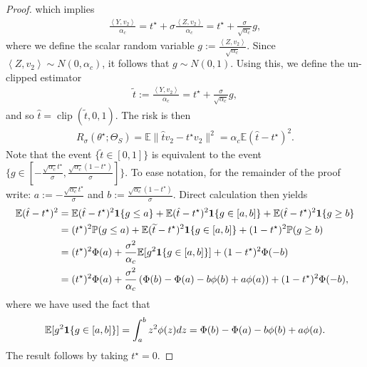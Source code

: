 \documentclass[11pt]{article}
\theoremstyle{plain}
\theoremstyle{definition}
\newcommand{\indicator}{{\bf{1}}}
\newcommand{\E}{\mathbb{E}}
\renewcommand{\P}{\mathbb{P}}
\newcommand{\tildet}{\widetilde{t}}
\newcommand{\hatt}{\hat{t}}
\newcommand{\inparen}[1]{\left(#1\right)}             %
\newcommand{\inp}[1]{\ensuremath{\left\langle #1 \right\rangle}}
\begin{document}
\begin{proof}
which implies 
\begin{align*}
    \frac{\inp{Y,v_2}}{\alpha_c} 
    = t^\star + \sigma \frac{\inp{Z, v_2}}{\alpha_c}
    = t^\star + \frac{\sigma}{\sqrt{\alpha_c}}g,
\end{align*}
where we define the scalar random variable $g:= \frac{\inp{Z, v_2}}{ \sqrt{\alpha_c}}$. Since $\inp{Z, v_2} \sim N(0, \alpha_c)$, it follows that $g \sim N(0,1)$.
Using this, we define the un-clipped estimator
\begin{align*}
    \tildet := \frac{\inp{Y,v_2}}{\alpha_c} = t^\star + \frac{\sigma}{\sqrt{\alpha_c}} g,
\end{align*}
and so $\hatt = \operatorname{clip}(\tildet,0,1)$. The risk is then 
\begin{align*}
    R_\sigma(\theta^\star; \Theta_S) = \E \| \hatt v_2 - t^\star v_2\|^2 = \alpha_c \E (\hatt - t^\star)^2.
\end{align*} 
Note that the event $\{\tildet \in [0,1]\}$ is equivalent to the event $\{ g \in [-\frac{\sqrt{\alpha_c}t^\star}{\sigma}, \frac{\sqrt{\alpha_c}(1-t^\star)}{\sigma}]\}$. To ease notation, for the remainder of the proof write: $a:= -\frac{\sqrt{\alpha_c}t^\star}{\sigma}$ and $b:= \frac{\sqrt{\alpha_c}(1-t^\star)}{\sigma}$. Direct calculation then yields 
\begin{align*}
    \E (\hatt - t^\star)^2
    &=
    \E (\hatt - t^\star)^2\indicator \{ g \le a \}
    +
    \E (\hatt - t^\star)^2\indicator \{ g \in [a,b] \}
    +
    \E (\hatt - t^\star)^2\indicator \{ g \ge b \}\\
    &=
    (t^\star)^2 \P ( g \le a )
    +
    \E (\tildet - t^\star)^2\indicator \{ g \in [a,b] \}
    +
    (1 - t^\star)^2  \P ( g \ge b)\\
    &=
    (t^\star)^2 \Phi(a)
    +
    \frac{\sigma^2}{\alpha_c }\E[ g^2 \indicator \{g \in [a,b] \} ]
    +
    (1 - t^\star)^2  \Phi(-b)\\
    &=
    (t^\star)^2 \Phi(a)
    +
    \frac{\sigma^2}{\alpha_c } \inparen{\Phi(b) - \Phi(a) - b\phi(b) +a \phi(a)}
    +
    (1 - t^\star)^2  \Phi(-b),
\end{align*}
where we have used the fact that 
\begin{align*}
    \E[ g^2 \indicator \{g \in [a,b] \} ]
    = \int_a^b z^2 \phi(z)dz = \Phi(b) - \Phi(a) - b\phi(b) + a \phi(a).
\end{align*}
The result follows by taking $t^\star = 0$.
\end{proof}
\end{document}
